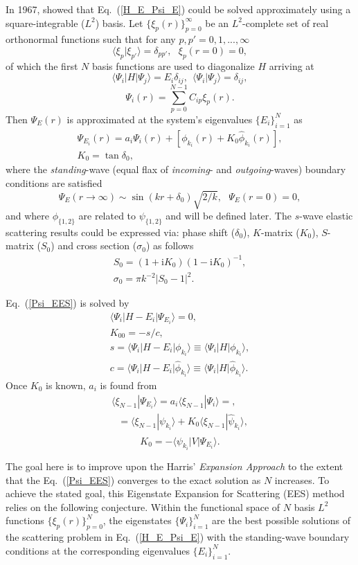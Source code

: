 \documentclass[aip
, pra
, showpacs
, aps
, twocolumn
, groupedaddress
, floatfix
]{revtex4}
\newcommand{\beq}{\begin{equation}}
\newcommand{\eeq}{\end{equation}}
\newcommand{\barr}{\begin{array}}
\newcommand{\earr}{\end{array}}
\begin{document}
In 1967, \citet{Harris67} showed that Eq.~(\ref{H_E_Psi_E}) could be solved
approximately using a square-integrable ($L^2$) basis.
Let $\{\xi_p(r)\}_{p=0}^\infty$ be an $L^2$-complete set of real orthonormal functions
such that for any $p,p'=0,1,...,\infty$
\beq
\langle \xi_p | \xi_{p'} \rangle=\delta_{pp'}, \ \ \ \xi_p(r=0)=0,
\eeq
of which the first $N$ basis functions are used to diagonalize $H$ arriving at
\beq
\langle \Psi_i |H| \Psi_j \rangle = E_i \delta_{ij} , \ \ \langle \Psi_i | \Psi_j \rangle=\delta_{ij},
\eeq
\beq
\Psi_i(r) = \sum_{p=0}^{N-1} C_{ip} \xi_p(r).
\eeq
Then $\Psi_E(r)$ is approximated at the system's eigenvalues $\{E_i\}_{i=1}^{N}$ as
\cite{Harris67}
\beq \barr{l}
\Psi_{E_i}(r) = a_i \Psi_i(r)  + [\phi_{k_i}(r)  + K_0 \widehat{\phi}_{k_i}(r)],\\
K_0 = \tan{\delta_0},
\earr \label{Psi_EES} \eeq
where the {\em standing}-wave (equal flax of {\em incoming}- and {\em outgoing}-waves) boundary conditions are satisfied
\beq
\Psi_E(r \rightarrow \infty) \sim  \sin(kr+\delta_0) \sqrt{2/k}, \ \ \ \Psi_E(r= 0)=0,
\eeq
and where $\phi_{\{1,2\}}$ are related to $\psi_{\{1,2\}}$ and will be defined later.
The $s$-wave elastic scattering results could be expressed via:
phase shift ($\delta_0$), $K$-matrix ($K_0$), $S$-matrix ($S_{0}$) and cross section ($\sigma_{0}$)
as follows
\beq \barr{l}
S_{0}=(1+\mbox{i}K_0)(1-\mbox{i}K_0)^{-1}, \\
\sigma_{0}=\pi k^{-2} |S_{0}-1|^2.
\earr \eeq


Eq.~(\ref{Psi_EES}) is solved by
\beq \barr{l}
\langle\Psi_i|H-E_i|\Psi_{E_i}\rangle=0,\\
K_{00} = - s / c, \\
s = \langle\Psi_i|H-E_i|  \phi_{k_i} \rangle \equiv \langle\Psi_i|H|  \phi_{k_i} \rangle, \\
c = \langle\Psi_i|H-E_i|  \widehat{\phi}_{k_i} \rangle \equiv \langle\Psi_i|H|  \widehat{\phi}_{k_i} \rangle.
\earr \eeq
Once $K_0$ is known, $a_i$ is found from
\beq \barr{l}
\langle \xi_{N-1} | \Psi_{E_i}\rangle
= a_i \langle \xi_{N-1}| \Psi_i \rangle = ,\\
\ \ \ =  \langle \xi_{N-1}| \psi_{k_i} \rangle
+ K_0 \langle \xi_{N-1}| \widehat{\psi}_{k_i} \rangle ,\\
\earr \eeq
\beq
K_0 = -\langle \psi_{k_i} | V | \Psi_{E_i} \rangle.
\eeq


The goal here is to improve upon the Harris' {\em Expansion Approach} \cite{Harris67} to the extent that the Eq.~(\ref{Psi_EES})
converges to the exact solution as $N$ increases.
To achieve the stated goal, this Eigenstate Expansion for Scattering (EES) method relies on the following conjecture.
Within the functional space of $N$ basis $L^2$ functions  $\{\xi_p(r)\}_{p=0}^N$,
the eigenstates $\{\Psi_i\}_{i=1}^{N}$ are the best possible solutions of the scattering problem in Eq.~(\ref{H_E_Psi_E})
with the standing-wave boundary conditions at the corresponding eigenvalues $\{E_i\}_{i=1}^{N}$.
\end{document}
